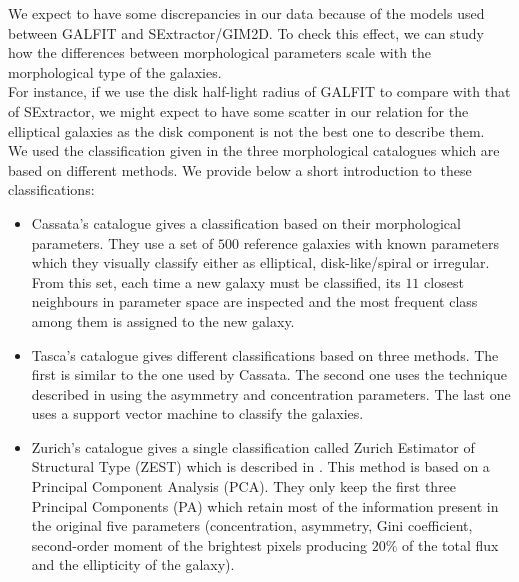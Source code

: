 We expect to have some discrepancies in our data because of the models used between GALFIT and SExtractor/GIM2D. To check this effect, we can study how the differences between morphological parameters scale with the morphological type of the galaxies. \\

For instance, if we use the disk half-light radius of GALFIT to compare with that of SExtractor, we might expect to have some scatter in our relation for the elliptical galaxies as the disk component is not the best one to describe them.\\

We used the classification given in the three morphological catalogues which are based on different methods. We provide below a short introduction to these classifications:\\


\begin{itemize}
	\item Cassata's catalogue gives a classification based on their morphological parameters. They use a set of $500$ reference galaxies with known parameters which they visually classify either as elliptical, disk-like/spiral or irregular. From this set, each time a new galaxy must be classified, its $11$ closest neighbours in parameter space are inspected and the most frequent class among them is assigned to the new galaxy.
	
	\item Tasca's catalogue gives different classifications based on three methods. The first is similar to the one used by Cassata. The second one uses the technique described in  using the asymmetry and concentration parameters. The last one uses a support vector machine to classify the galaxies.
	
	\item Zurich's catalogue gives a single classification called Zurich Estimator of Structural Type (ZEST) which is described in . This method is based on a Principal Component Analysis (PCA). They only keep the first three Principal Components (PA) which retain most of the information present in the original five parameters (concentration, asymmetry, Gini coefficient, second-order moment of the brightest pixels producing $20\%$ of the total flux and the ellipticity of the galaxy).
\end{itemize}


